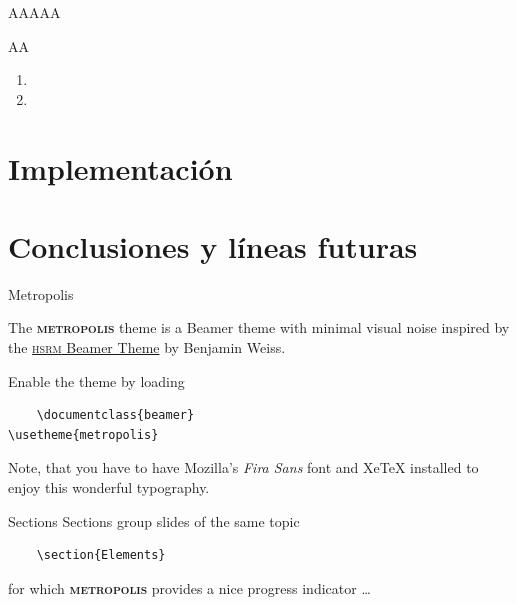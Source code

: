 \documentclass[10pt,spanish,xcolor={svgnames}]{beamer}
\newcommand{\themename}{\textbf{\textsc{metropolis}}\xspace}
\begin{document}
\begin{frame}{AAAAA}
\vspace*{-2em}
\begin{exampleblock}{AA}
\begin{enumerate}
\item
\vspace{1em}
\item\end{enumerate}
\end{exampleblock}
\note{\large \vfill
	\begin{center}
		\begin{enumerate}
			\item  
			\vspace{2em}	
			\item  
			\vspace{2em}
			\item  
			\vspace{2em}
			\vfill
		\end{enumerate}
\end{center}}
\end{frame}


\section{Implementación}
\section{Conclusiones y líneas futuras}







\begin{frame}[fragile]{Metropolis}

The \themename theme is a Beamer theme with minimal visual noise
inspired by the \href{https://github.com/hsrmbeamertheme/hsrmbeamertheme}{\textsc{hsrm} Beamer
Theme} by Benjamin Weiss.

Enable the theme by loading

\begin{verbatim}    \documentclass{beamer}
\usetheme{metropolis}\end{verbatim}

Note, that you have to have Mozilla's \emph{Fira Sans} font and XeTeX
installed to enjoy this wonderful typography.
\end{frame}
\begin{frame}[fragile]{Sections}
Sections group slides of the same topic

\begin{verbatim}    \section{Elements}\end{verbatim}

for which \themename provides a nice progress indicator \ldots
\end{frame}
\end{document}
